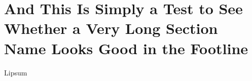 \documentclass[10pt]{beamer}
\begin{document}
\section{And This Is Simply a Test to See Whether a Very Long Section Name Looks Good in the Footline}

\begin{frame}{Lipsum}
  \begin{quotation}
    \lipsum[1]
  \end{quotation}
\end{frame}
\end{document}
